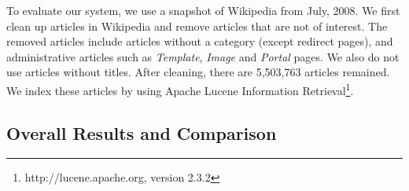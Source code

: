 To evaluate our system, we use a snapshot of Wikipedia from July,
2008. We first clean up articles in Wikipedia and remove articles that
are not of interest. The removed articles include articles without a
category (except redirect pages), and administrative articles such as
{\em Template}, {\em Image} and {\em Portal} pages. We also do not use
articles without titles. After cleaning, there are 5,503,763 articles
remained. We index these articles by using Apache Lucene Information
Retrieval\footnote{http://lucene.apache.org, version 2.3.2}.

\subsection{Overall Results and Comparison}
\label{sec:exp-results}


